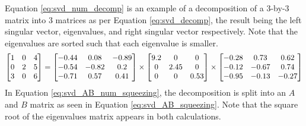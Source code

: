 Equation \ref{eq:svd_num_decomp} is an example of a decomposition of a 3-by-3 matrix into 3 matrices as per Equation \ref{eq:svd_decomp}, the result being the left singular vector, eigenvalues, and right singular vector respectively. Note that the eigenvalues are sorted such that each eigenvalue is smaller.
\footnotesize
\begin{equation}\label{eq:svd_num_decomp}
\centering
\begin{bmatrix}
1 & 0 & 4\\ 
0 & 2 & 5\\ 
3 & 0 & 6
\end{bmatrix} = 
\begin{bmatrix}
-0.44 & 0.08 	& -0.89 \\ 
-0.54 & -0.82 	& 0.2	\\ 
-0.71 & 0.57 	& 0.41
\end{bmatrix} \times 
\begin{bmatrix}
9.2 & 0		& 0		\\ 
0 	& 2.45	& 0		\\ 
0 	& 0		& 0.53
\end{bmatrix} \times
\begin{bmatrix}
   -0.28 &   0.73  &  0.62 \\
   -0.12 &  -0.67  &  0.74 \\
   -0.95 &  -0.13  & -0.27
\end{bmatrix}
\end{equation}
\normalsize
In Equation \ref{eq:svd_AB_num_squeezing}, the decomposition is split into an $A$ and $B$ matrix as seen in Equation \ref{eq:svd_AB_squeezing}. Note that the square root of the eigenvalues matrix appears in both calculations.
\footnotesize
